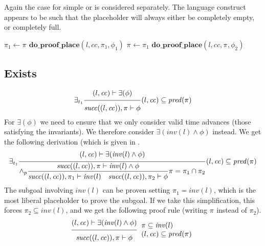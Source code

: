 \documentclass{article}
\newcommand{\proofrule}[3][]{#1 \frac{\raisebox{.7ex}{\normalsize{$#2$}}}
  {\raisebox{-1.0ex}{\normalsize{$#3$}}}}
\newcommand{\placeholder}[1][]{\pi_{#1}}
\newcommand{\loc}{l}
\newcommand{\region}{\mathit{cc}}
\newcommand{\suc}{\mathit{succ}}
\newcommand{\pre}{\mathit{pred}}
\newcommand{\inv}{\mathit{inv}}
\newcommand{\method}[1]{\ensuremath{\mathbf{#1}}}
\begin{document}
Again the case for simple or is considered separately. The language construct appears to be such that
the placeholder will always either be completely empty, or completely full.
\begin{algorithm}[H]
\caption{$\method{do\_proof\_place\_or\_simple}(\loc, \region, \placeholder, \phi_1 \lor \phi_2)$}
\begin{algorithmic}
\STATE $\placeholder[1] \gets \placeholder$
\STATE $\method{do\_proof\_place}(\loc, \region, \placeholder[1], \phi_1)$
\IF{$\placeholder[1] = \placeholder$}
  \STATE $\placeholder \gets \placeholder[1]$
\ELSE
  \STATE $\method{do\_proof\_place}(\loc, \region, \placeholder, \phi_2)$
\ENDIF
\end{algorithmic}
\end{algorithm}

\subsection{Exists}

\[
\proofrule[\exists_{t_1}]
{(\loc, \region) \vdash \exists(\phi)}
{\suc((\loc, \region)), \placeholder \vdash \phi}
(\loc, \region) \subseteq \pre(\placeholder)
\]
%
For $\exists(\phi)$ we need to ensure that we only consider valid time advances (those satisfying the invariants).
We therefore consider $\exists(\inv(\loc) \land \phi)$ instead.
We get the following derivation (which is given in \cite[Appendix C.2]{FC:14}.
\[
\proofrule[\exists_{t_1}]
{(\loc, \region) \vdash \exists(\inv(\loc) \land \phi)}
{
  \proofrule[\land_p]
  {\suc((\loc, \region)), \placeholder \vdash \inv(\loc) \land \phi}
  {\suc((\loc, \region)), \placeholder[1] \vdash \inv(\loc)
  \quad \suc((\loc, \region)), \placeholder[2] \vdash \phi}
  \placeholder = \placeholder[1] \cap \placeholder[2]
}
(\loc, \region) \subseteq \pre(\placeholder)
\]
The subgoal involving $\inv(\loc)$ can be proven setting $\placeholder[1] = \inv(\loc)$, which is
the most liberal placeholder to prove the subgoal. If we take this simplification, this forces $\placeholder[2] \subseteq \inv(\loc)$,
and we get the following proof rule (writing $\placeholder$ instead of $\placeholder[2]$).
\[
\proofrule
{(\loc, \region) \vdash \exists(\inv(\loc) \land \phi)}
{\suc((\loc, \region)), \placeholder \vdash \phi}
\begin{array}{l}
\placeholder \subseteq \inv(\loc) \\
(\loc, \region) \subseteq \pre(\placeholder)
\end{array}
\]
\end{document}
